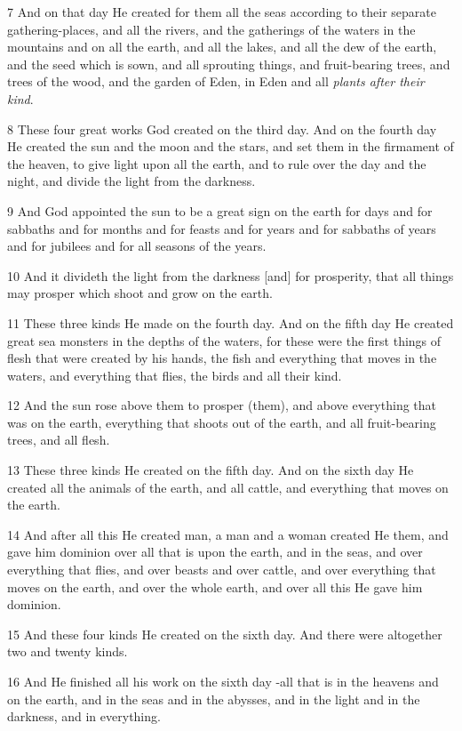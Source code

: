 \par 7 And on that day He created for them all the seas according to their separate gathering-places, and all the rivers, and the gatherings of the waters in the mountains and on all the earth, and all the lakes, and all the dew of the earth, and the seed which is sown, and all sprouting things, and fruit-bearing trees, and trees of the wood, and the garden of Eden, in Eden and all \textit{plants after their kind}.
\par 8 These four great works God created on the third day. And on the fourth day He created the sun and the moon and the stars, and set them in the firmament of the heaven, to give light upon all the earth, and to rule over the day and the night, and divide the light from the darkness.
\par 9 And God appointed the sun to be a great sign on the earth for days and for sabbaths and for months and for feasts and for years and for sabbaths of years and for jubilees and for all seasons of the years.
\par 10 And it divideth the light from the darkness [and] for prosperity, that all things may prosper which shoot and grow on the earth.
\par 11 These three kinds He made on the fourth day. And on the fifth day He created great sea monsters in the depths of the waters, for these were the first things of flesh that were created by his hands, the fish and everything that moves in the waters, and everything that flies, the birds and all their kind.
\par 12 And the sun rose above them to prosper (them), and above everything that was on the earth, everything that shoots out of the earth, and all fruit-bearing trees, and all flesh.
\par 13 These three kinds He created on the fifth day. And on the sixth day He created all the animals of the earth, and all cattle, and everything that moves on the earth.
\par 14 And after all this He created man, a man and a woman created He them, and gave him dominion over all that is upon the earth, and in the seas, and over everything that flies, and over beasts and over cattle, and over everything that moves on the earth, and over the whole earth, and over all this He gave him dominion.
\par 15 And these four kinds He created on the sixth day. And there were altogether two and twenty kinds.
\par 16 And He finished all his work on the sixth day -all that is in the heavens and on the earth, and in the seas and in the abysses, and in the light and in the darkness, and in everything.
